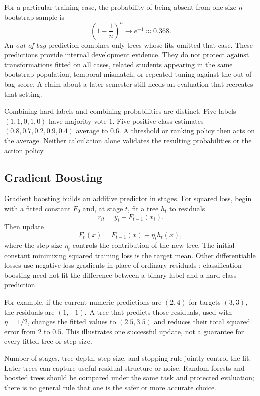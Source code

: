 For a particular training case, the probability of being absent from one size-$n$ bootstrap sample is
\[
\left(1-\frac1n\right)^n\longrightarrow e^{-1}\approx0.368.
\]
An \emph{out-of-bag} prediction combines only trees whose fits omitted that case. These predictions provide internal development evidence. They do not protect against transformations fitted on all cases, related students appearing in the same bootstrap population, temporal mismatch, or repeated tuning against the out-of-bag score. A claim about a later semester still needs an evaluation that recreates that setting.

Combining hard labels and combining probabilities are distinct. Five labels $(1,1,0,1,0)$ have majority vote $1$. Five positive-class estimates $(0.8,0.7,0.2,0.9,0.4)$ average to $0.6$. A threshold or ranking policy then acts on the average. Neither calculation alone validates the resulting probabilities or the action policy.

\subsection{Gradient Boosting}

Gradient boosting builds an additive predictor in stages. For squared loss, begin with a fitted constant $F_0$ and, at stage $t$, fit a tree $h_t$ to residuals
\[
r_{it}=y_i-F_{t-1}(x_i).
\]
Then update
\[
F_t(x)=F_{t-1}(x)+\eta_t h_t(x),
\]
where the step size $\eta_t$ controls the contribution of the new tree. The initial constant minimizing squared training loss is the target mean. Other differentiable losses use negative loss gradients in place of ordinary residuals \citep{friedman2001boosting}; classification boosting need not fit the difference between a binary label and a hard class prediction.

For example, if the current numeric predictions are $(2,4)$ for targets $(3,3)$, the residuals are $(1,-1)$. A tree that predicts those residuals, used with $\eta=1/2$, changes the fitted values to $(2.5,3.5)$ and reduces their total squared error from $2$ to $0.5$. This illustrates one successful update, not a guarantee for every fitted tree or step size.

Number of stages, tree depth, step size, and stopping rule jointly control the fit. Later trees can capture useful residual structure or noise. Random forests and boosted trees should be compared under the same task and protected evaluation; there is no general rule that one is the safer or more accurate choice.

